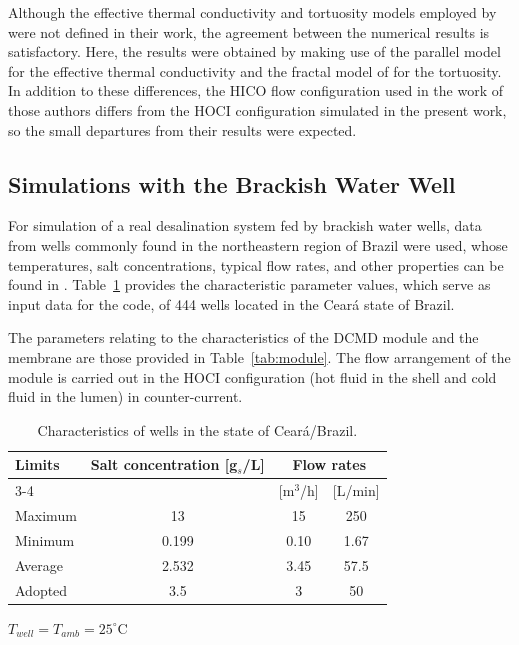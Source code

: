 \documentclass[14pt,letterpaper,fleqn]{extarticle}
\renewcommand{\textbf}[1]{#1}
\begin{document}
Although the effective thermal conductivity and tortuosity models employed by
\citet{Guan2014} were not defined in their work, the agreement between the numerical
results is satisfactory. Here, the results were obtained by making use of the parallel
model for the effective thermal conductivity and the fractal model of
\citet{EliasKohav1991} for the tortuosity. In addition to these differences, the HICO
flow configuration used in the work of those authors differs from the HOCI configuration
simulated in the present work, so the small departures from their results were expected.

\subsection{Simulations with the Brackish Water Well}

For simulation of a real desalination system fed by brackish water wells, data from
wells commonly found in the northeastern region of Brazil were used, whose temperatures,
salt concentrations, typical flow rates, and other properties can be found in
\citet{Veiga2017}. Table~\ref{tab:wells} provides the characteristic parameter values,
which serve as input data for the code, of 444 wells located in the Ceará state of
Brazil.

The parameters relating to the characteristics of the DCMD module and the membrane are
those provided in Table~\ref{tab:module}. The flow arrangement of the module is carried
out in the HOCI configuration (hot fluid in the shell and cold fluid in the lumen) in
counter-current.

\begin{table}[!htbp]
\centering
\caption{Characteristics of wells in the state of Ceará/Brazil.}
\label{tab:wells}
\begin{tabular}{lccc}
\toprule
\textbf{Limits} & \textbf{Salt concentration [g$_s$/L]}
& \multicolumn{2}{c}{\textbf{Flow rates}} \\
\cmidrule(lr){3-4}
 & & \textbf{[m$^3$/h]} & \textbf{[L/min]} \\
\midrule
Maximum & 13 & 15 & 250 \\
Minimum & 0.199 & 0.10 & 1.67 \\
Average & 2.532 & 3.45 & 57.5 \\
\textbf{Adopted} & \textbf{3.5} & \textbf{3} & \textbf{50} \\
\bottomrule
\end{tabular}

\smallskip\footnotesize $T_{well} = T_{amb} = 25^\circ$C
\end{table}
\end{document}
